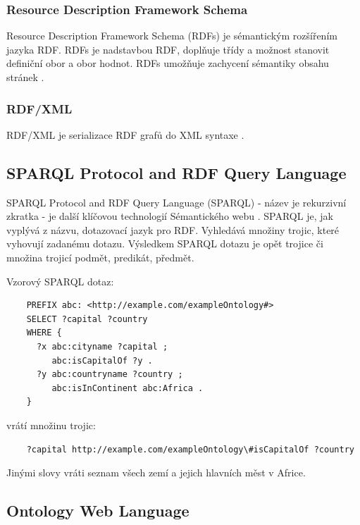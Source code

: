         \subsubsection{Resource Description Framework Schema}
        
        Resource Description Framework Schema (RDFs) je sémantickým rozšířením jazyka RDF.
        RDFs je nadstavbou RDF, doplňuje třídy a možnost stanovit definiční obor a obor hodnot. RDFs umožňuje zachycení sémantiky obsahu stránek \cite{ontowww}.
        
        \subsubsection{RDF/XML}
        
        RDF/XML je serializace RDF grafů do XML syntaxe \cite{rdfxml}. 
    
    \subsection{SPARQL Protocol and RDF Query Language}
    
    SPARQL Protocol and RDF Query Language (SPARQL) - název je rekurzivní zkratka - je další klíčovou technologií Sémantického webu \cite{sparqlwiki}.
    SPARQL je, jak vyplývá z názvu, dotazovací jazyk pro RDF. Vyhledává množiny trojic, které vyhovují zadanému dotazu.   
    Výsledkem SPARQL dotazu je opět trojice či množina trojicí podmět, predikát, předmět.
    
    Vzorový SPARQL dotaz:
    
    \begin{verbatim}
    PREFIX abc: <http://example.com/exampleOntology#> 
    SELECT ?capital ?country
    WHERE {
      ?x abc:cityname ?capital ;
         abc:isCapitalOf ?y .
      ?y abc:countryname ?country ;
         abc:isInContinent abc:Africa .
    }
    \end{verbatim}
    
    vrátí množinu trojic:
    
    \begin{verbatim}
    ?capital http://example.com/exampleOntology\#isCapitalOf ?country
     \end{verbatim}
     
     Jinými slovy vráti seznam všech zemí a jejich hlavních měst v Africe.
        
    \subsection{Ontology Web Language}

